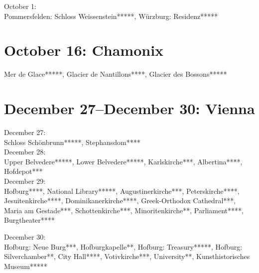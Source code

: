 October 1:\\
Pommersfelden: Schloss Weissenstein*****, W\"urzburg: Residenz*****

\section{October 16: Chamonix}
\label{Chamonix2011}

Mer de Glace*****, Glacier de Nantillons****, Glacier des Bossons*****

\section{December 27--December 30: Vienna}
\label{Vienna2011}

December 27:\\
Schloss Sch\"onbrunn*****, Stephansdom****\\

December 28:\\
Upper Belvedere*****, Lower Belvedere*****, Karlskirche***, Albertina****, Hofdepot***\\

December 29:\\
Hofburg****, National Library*****, Augustinerkirche***, Peterskirche****, Jesuitenkirche****, Dominikanerkirche****, Greek-Orthodox Cathedral***, Maria am Gestade***, Schottenkirche***, Minoritenkirche**, Parliament****, Burgtheater****

December 30:\\
Hofburg: Neue Burg***, Hofburgkapelle**, Hofburg: Treasury*****, Hofburg: Silverchamber**, City Hall****, Votivkirche***, University**, Kunsthistorisches Museum*****